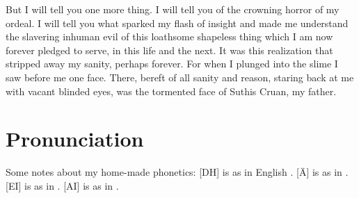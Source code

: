 \documentclass
  [a4paper,
   12pt,
   oneside
  ]%
  {article}
\begin{document}
But I will tell you one more thing. 
I will tell you of the crowning horror of my ordeal. 
I will tell you what sparked my flash of insight and made me understand the slavering inhuman evil of this loathsome shapeless thing which I am now forever pledged to serve, in this life and the next. 
It was this realization that stripped away my sanity, perhaps forever. 
For when I plunged into the slime I saw before me one face. 
There, bereft of all sanity and reason, staring back at me with vacant blinded eyes, was the tormented face of Suthis Cruan, my father. 









\appendix
\section{Pronunciation}
Some notes about my home-made phonetics: 
[DH] is as in English . 
[Ä] is as in .
[EI] is as in .
[AI] is as in . 

\begin{pronunciationenvironment}{
}
\end{pronunciationenvironment}
\end{document}
